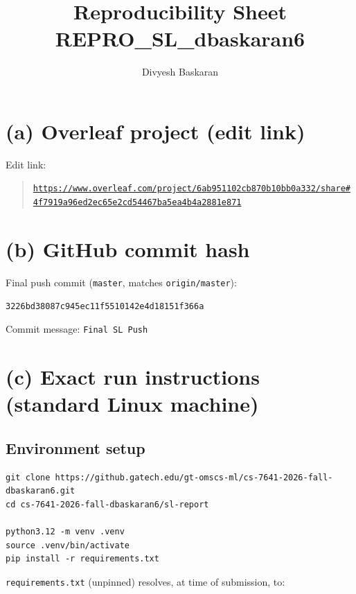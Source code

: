\documentclass[11pt]{article}
\title{Reproducibility Sheet \\ \large REPRO\_SL\_dbaskaran6}
\author{Divyesh Baskaran}
\date{}
\newcommand{\code}[1]{\texttt{#1}}
\begin{document}
\sloppy
\maketitle

\section*{(a) Overleaf project (edit link)}

\noindent Edit link:
\begin{quote}
\small\raggedright
\href{https://www.overleaf.com/project/6ab951102cb870b10bb0a332/share#4f7919079198a96ed2ec65e2cd54467ba5ea4b4a2881e871}{%
\texttt{https://www.overleaf.com/project/6ab951\allowbreak 102cb8\allowbreak 70b10b\allowbreak b0a332/share\#4f7919\allowbreak a96ed2\allowbreak ec65e2\allowbreak cd5446\allowbreak 7ba5ea\allowbreak 4b4a28\allowbreak 81e871}}
\end{quote}

\section*{(b) GitHub commit hash}

Final push commit (\code{master}, matches \code{origin/master}):

\begin{verbatim}
3226bd38087c945ec11f5510142e4d18151f366a
\end{verbatim}

Commit message: \code{Final SL Push}

\section*{(c) Exact run instructions (standard Linux machine)}

\subsection*{Environment setup}

\begin{verbatim}
git clone https://github.gatech.edu/gt-omscs-ml/cs-7641-2026-fall-dbaskaran6.git
cd cs-7641-2026-fall-dbaskaran6/sl-report

python3.12 -m venv .venv
source .venv/bin/activate
pip install -r requirements.txt
\end{verbatim}

\code{requirements.txt} (unpinned) resolves, at time of submission, to:
\end{document}
